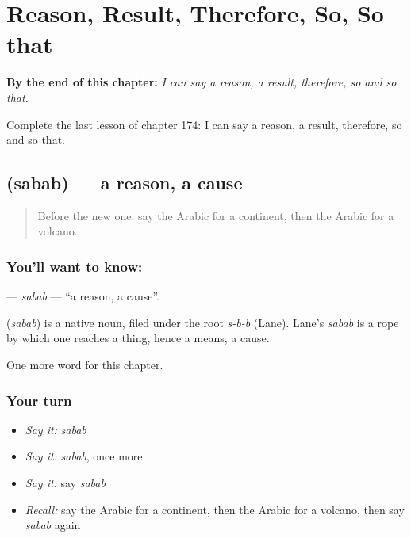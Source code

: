 
\chapter{Reason, Result, Therefore, So, So that}
\label{ch:ar-reason-result-therefore-so-so-that}

\begin{chapteropening}
\textbf{By the end of this chapter:} \emph{I can say a reason, a result, therefore, so and so that.}

Complete the last lesson of chapter 174: I can say a reason, a result, therefore, so and so that.
\end{chapteropening}

\section[\texorpdfstring{\ar{سبب} (sabab)}{سبب (sabab)}]{ (sabab) — a reason, a cause}

\label{lesson:AR-C174-sabab}



\begin{quote}
Before the new one: say the Arabic for a continent, then the Arabic for a volcano.
\end{quote}

\subsection*{You'll want to know: }
\textbf{} — \emph{sabab} — \textquotedblleft{}a reason, a cause\textquotedblright{}.

\begin{cousinweb}
\textbf{} (\emph{sabab}) is a native noun, filed under the root \emph{s-b-b} (Lane). Lane's \emph{sabab} is a rope by which one reaches a thing, hence a means, a cause.
\end{cousinweb}

\begin{grammarlens}[title={What you've built}]
One more word for this chapter.
\end{grammarlens}

\subsection*{Your turn}
\begin{itemize}
\raggedright
  \item \emph{Say it:} \emph{sabab}
  \item \emph{Say it:} \emph{sabab}, once more
  \item \emph{Say it:} say \emph{sabab}
  \item \emph{Recall:} say the Arabic for a continent, then the Arabic for a volcano, then say \emph{sabab} again
\end{itemize}


